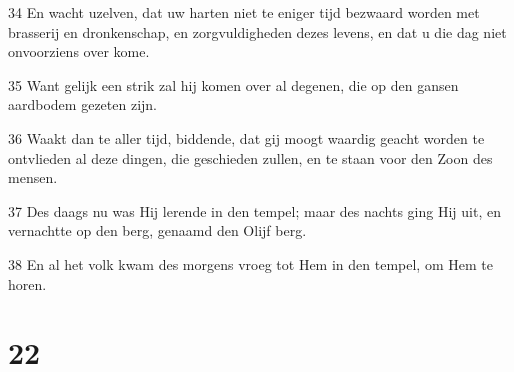 \par 34 En wacht uzelven, dat uw harten niet te eniger tijd bezwaard worden met brasserij en dronkenschap, en zorgvuldigheden dezes levens, en dat u die dag niet onvoorziens over kome.
\par 35 Want gelijk een strik zal hij komen over al degenen, die op den gansen aardbodem gezeten zijn.
\par 36 Waakt dan te aller tijd, biddende, dat gij moogt waardig geacht worden te ontvlieden al deze dingen, die geschieden zullen, en te staan voor den Zoon des mensen.
\par 37 Des daags nu was Hij lerende in den tempel; maar des nachts ging Hij uit, en vernachtte op den berg, genaamd den Olijf berg.
\par 38 En al het volk kwam des morgens vroeg tot Hem in den tempel, om Hem te horen.

\chapter{22}

